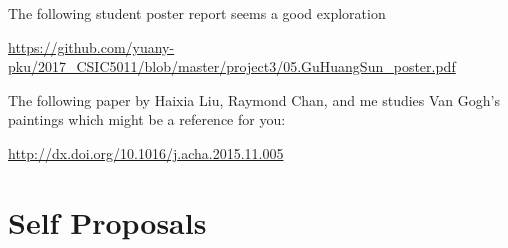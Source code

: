 \documentclass[11pt]{article}
\begin{document}
The following student poster report seems a good exploration

\url{https://github.com/yuany-pku/2017_CSIC5011/blob/master/project3/05.GuHuangSun_poster.pdf}

The following paper by Haixia Liu, Raymond Chan, and me studies Van Gogh's paintings which might be a reference for you:

\url{http://dx.doi.org/10.1016/j.acha.2015.11.005}


\section{Self Proposals}
%
%
%
%
\end{document}
